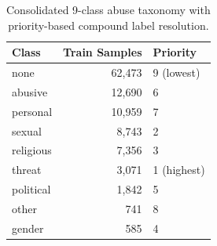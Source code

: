 \begin{table}[t]
\centering
\caption{Consolidated 9-class abuse taxonomy with priority-based compound label resolution.}
\label{tab:labels}
\begin{tabular}{lrl}
\toprule
\textbf{Class} & \textbf{Train Samples} & \textbf{Priority} \\
\midrule
none       & 62,473  & 9 (lowest)  \\
abusive    & 12,690  & 6 \\
personal   & 10,959  & 7 \\
sexual     & 8,743   & 2 \\
religious  & 7,356   & 3 \\
threat     & 3,071   & 1 (highest) \\
political  & 1,842   & 5 \\
other      & 741     & 8 \\
gender     & 585     & 4 \\
\bottomrule
\end{tabular}
\end{table}